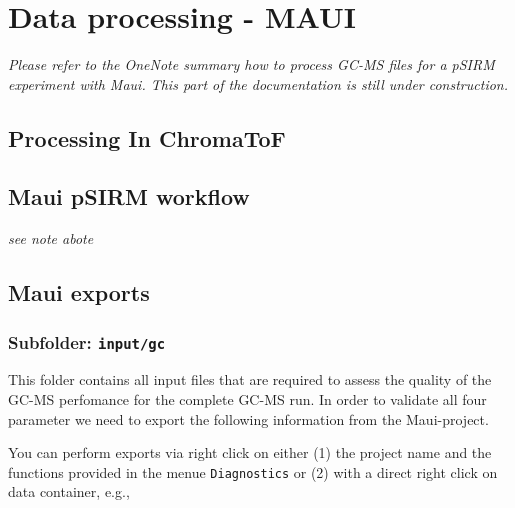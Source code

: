 \documentclass[]{book}
\begin{document}
\hypertarget{mauiproc}{%
\chapter{Data processing - MAUI}\label{mauiproc}}

\emph{Please refer to the OneNote summary how to process GC-MS files for a pSIRM experiment with Maui.
This part of the documentation is still under construction.}

\hypertarget{processing-in-chromatof}{%
\section{Processing In ChromaToF}\label{processing-in-chromatof}}

\hypertarget{mauipsirm}{%
\section{Maui pSIRM workflow}\label{mauipsirm}}

\emph{see note abote}

\hypertarget{mauiexport}{%
\section{Maui exports}\label{mauiexport}}

\hypertarget{subfolder-inputgc}{%
\subsection{\texorpdfstring{Subfolder: \texttt{input/gc}}{Subfolder: input/gc}}\label{subfolder-inputgc}}

This folder contains all input files that are required to assess the quality of the GC-MS perfomance for the complete GC-MS run. In order to validate all four parameter we need to export the following information from the Maui-project.

You can perform exports via right click on either (1) the project name and the functions provided in the menue \texttt{Diagnostics} or (2) with a direct right click on data container, e.g.,
\end{document}
